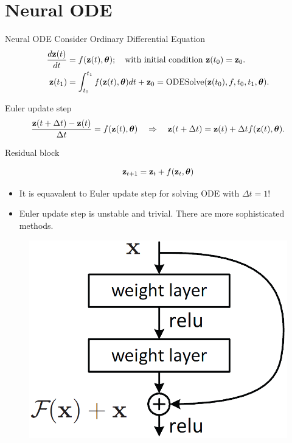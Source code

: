 \section{Neural ODE}
\begin{frame}{Neural ODE}
	Consider Ordinary Differential Equation    
	\begin{align*}
	    \frac{d \mathbf{z}(t)}{dt} &= f(\mathbf{z}(t), \boldsymbol{\theta}); \quad \text{with initial condition }\mathbf{z}(t_0) = \mathbf{z}_0. \\
	    \mathbf{z}(t_1) &= \int^{t_1}_{t_0} f(\mathbf{z}(t), \boldsymbol{\theta}) d t  + \mathbf{z}_0 = \text{ODESolve}(\mathbf{z}(t_0), f, t_0,t_1, \boldsymbol{\theta}).
	\end{align*}
	\vspace{-0.4cm}
	\begin{block}{Euler update step}
		\vspace{-0.6cm}
		\[
		    \frac{\mathbf{z}(t + \Delta t) - \mathbf{z}(t)}{\Delta t} = f(\mathbf{z}(t), \boldsymbol{\theta}) \quad \Rightarrow \quad \mathbf{z}(t + \Delta t) = \mathbf{z}(t) + \Delta t f(\mathbf{z}(t), \boldsymbol{\theta}).
		\]
		\vspace{-0.7cm}
	\end{block}
	\begin{block}{Residual block}
		\begin{minipage}[t]{0.7\columnwidth}
			\vspace{-0.4cm}
			\[
				\mathbf{z}_{t + 1} = \mathbf{z}_t + f(\mathbf{z}_t, \boldsymbol{\theta})
			\]
			\vspace{-0.6cm}
			\begin{itemize}
				 \item It is equavalent to Euler update step for solving ODE with $\Delta t = 1$!
				 \item Euler update step is unstable and trivial. There are more sophisticated methods.
			\end{itemize}
		\end{minipage}%
		\begin{minipage}[t]{0.3\columnwidth}
			\vspace{-0.2cm}
			\begin{figure}
			    \centering
			    \includegraphics[width=\linewidth]{figs/resnet_1.png}
			\end{figure}
		\end{minipage}
		\vspace{-0.4cm}
	\end{block}


\end{frame}
